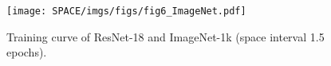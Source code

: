 \begin{figure} [h]
    \centering
    \texttt{[image: SPACE/imgs/figs/fig6\_ImageNet.pdf]}
    \caption{Training curve of ResNet-18 and ImageNet-1k (space interval 1.5 epochs).%
    }
    \label{fig:imagenet}
    \vspace{-.2cm}
\end{figure}